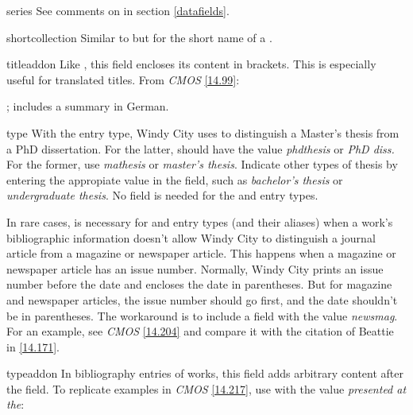 \documentclass[11pt,letterpaper,oneside]{article}
\begin{document}
\begin{marglist}
\begin{bibonly}
\nocite{faraday,huang2015,jubb2015,lucki1980}
\end{bibonly}

\item[series] See comments on  in section
\ref{datafields}.

\item[shortcollection] Similar to  but for the
short name of a .

\item[titleaddon] Like , this field encloses its
content in brackets. This is especially useful for translated titles.
From \textit{CMOS} \ref{14.99}:

\begin{citebib}
\item \cite{wereszycki1977}; includes a summary in German.
\item \cite{pirumova1977b}
\end{citebib}

\item[type] With the  entry type, Windy City uses
 to distinguish a Master's thesis from a PhD
dissertation. For the latter,  should have the value
\textit{phdthesis} or \textit{PhD diss.} For the former, use
\textit{mathesis} or \textit{master's thesis}. Indicate other types of
thesis by entering the appropiate value in the field, such as
\textit{bachelor's thesis} or \textit{undergraduate thesis}. No
 field is needed for the  and
 entry types.

In rare cases,  is necessary for  and
 entry types (and their aliases) when a work's
bibliographic information doesn't allow Windy City to distinguish a
journal article from a magazine or newspaper article. This happens
when a magazine or newspaper article has an issue number. Normally,
Windy City prints an issue number before the date and encloses the
date in parentheses. But for magazine and newspaper articles, the
issue number should go first, and the date shouldn't be in
parentheses. The workaround is to include a  field with
the value \textit{newsmag}. For an example, see \textit{CMOS}
\ref{14.204} and compare it with the citation of Beattie in
\ref{14.171}.

\item[typeaddon] In bibliography entries of 
works, this field adds arbitrary content after the 
field. To replicate examples in \textit{CMOS} \ref{14.217}, use
 with the value \textit{presented at the}:


\end{marglist}
\end{document}
